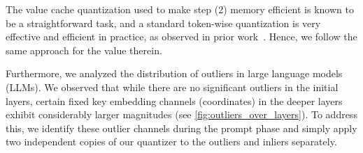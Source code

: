 \documentclass[11pt]{article}
\theoremstyle{plain}
\theoremstyle{definition}
\theoremstyle{remark}
\begin{document}

\fi

The value cache quantization used to make step (2) memory efficient is known to be a straightforward task, and a standard token-wise quantization is very effective and efficient in practice, as observed in prior work~\cite{liu2024kivi, hooper2024kvquant}. 
Hence, we follow the same approach for the value therein.

Furthermore, we analyzed the distribution of outliers in large language models (LLMs). 
We observed that while there are no significant outliers in the initial layers, certain fixed key embedding channels (coordinates) in the deeper layers exhibit considerably larger magnitudes (see \cref{fig:outliers_over_layers}). 
To address this, we identify these outlier channels during the prompt phase and simply apply two independent copies of our quantizer to the outliers and inliers separately.
\end{document}

